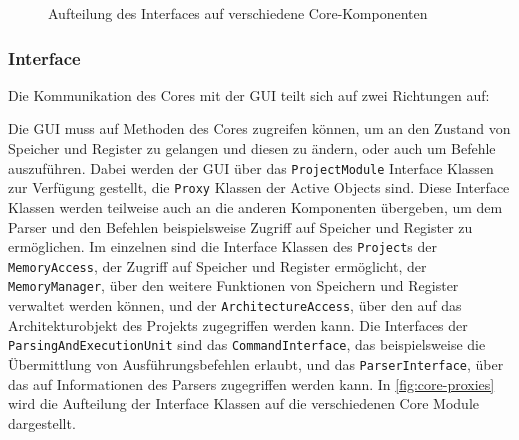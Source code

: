 \begin{figure}[H]
\begin{center}

    \end{center}
    \caption{Aufteilung des Interfaces auf verschiedene Core-Komponenten}
    \label{fig:core-proxies}
\end{figure}

\subsubsection{Interface}

Die Kommunikation des Cores mit der GUI teilt sich auf zwei Richtungen auf:

Die GUI muss auf Methoden des Cores zugreifen können, um an den Zustand von
Speicher und Register zu gelangen und diesen zu ändern, oder auch um Befehle
auszuführen. Dabei werden der GUI über das \texttt{ProjectModule} Interface
Klassen zur Verfügung gestellt, die \texttt{Proxy} Klassen der Active Objects
sind. Diese Interface Klassen werden teilweise auch an die anderen Komponenten
übergeben, um dem Parser und den Befehlen beispielsweise Zugriff auf Speicher
und Register zu ermöglichen. Im einzelnen sind die Interface Klassen des
\texttt{Project}s der \texttt{MemoryAccess}, der Zugriff auf Speicher und
Register ermöglicht, der \texttt{MemoryManager}, über den weitere Funktionen von
Speichern und Register verwaltet werden können, und der
\texttt{ArchitectureAccess}, über den auf das Architekturobjekt des Projekts
zugegriffen werden kann. Die Interfaces der \texttt{ParsingAndExecutionUnit}
sind das \texttt{CommandInterface}, das beispielsweise die Übermittlung von
Ausführungsbefehlen erlaubt, und das \texttt{ParserInterface}, über das auf
Informationen des Parsers zugegriffen werden kann. In \autoref{fig:core-proxies}
wird die Aufteilung der Interface Klassen auf die verschiedenen Core Module
dargestellt.

